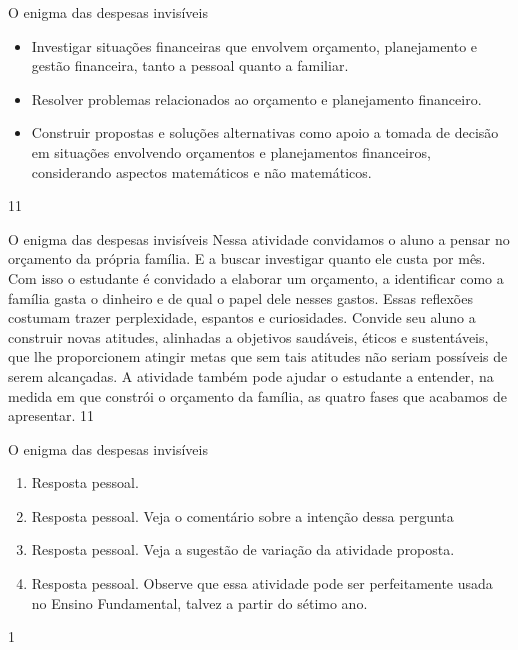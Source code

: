 \clearpage
\begin{objectives}{O enigma das despesas invisíveis}
{
\begin{itemize}
\item Investigar situações financeiras que envolvem orçamento, planejamento e gestão financeira, tanto a pessoal quanto a familiar.
\item Resolver problemas relacionados ao orçamento e planejamento financeiro. 
\item Construir propostas e soluções alternativas como apoio a tomada de decisão em situações envolvendo orçamentos e planejamentos financeiros, considerando aspectos matemáticos e não matemáticos. 
\end{itemize}
}{1}{1}
\end{objectives}
\begin{sugestions}{O enigma das despesas invisíveis}
{
Nessa atividade convidamos o aluno a pensar no orçamento da própria família. E a buscar investigar quanto ele custa por mês. Com isso o estudante é convidado a elaborar um orçamento, a identificar como a família gasta o dinheiro e de qual o papel dele nesses gastos. Essas reflexões costumam trazer perplexidade, espantos e curiosidades. Convide seu aluno a construir novas atitudes, alinhadas a objetivos saudáveis, éticos e sustentáveis, que lhe proporcionem atingir metas que sem tais atitudes não seriam possíveis de serem alcançadas. A atividade também pode ajudar o estudante a entender, na medida em que constrói o orçamento da família, as quatro fases que acabamos de apresentar.
}{1}{1}
\end{sugestions}
\begin{answer}{O enigma das despesas invisíveis}
{
\begin{enumerate}
\item Resposta pessoal.
\item Resposta pessoal. Veja o comentário sobre a intenção dessa pergunta
\item Resposta pessoal. Veja a sugestão de variação da atividade proposta.
\item Resposta pessoal. Observe que essa atividade pode ser perfeitamente usada no Ensino Fundamental, talvez a partir do sétimo ano.
\end{enumerate}
}{1}
\end{answer}
